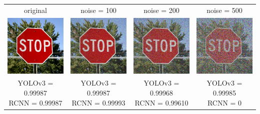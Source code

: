 \documentclass{article}
\begin{document}
\begin{center}
\begin{tabular}{ c c c c }
    original & noise = 100 & noise = 200 & noise = 500 \\
    \includegraphics[width=0.2\linewidth]{../test_images/stop.png} & \includegraphics[width=0.2\linewidth]{../test_images/perturbed/stop_noise_100.png} & \includegraphics[width=0.2\linewidth]{../test_images/perturbed/stop_noise_200.png} & \includegraphics[width=0.2\linewidth]{../test_images/perturbed/stop_noise_500.png} \\
    \makecell{YOLOv3 = 0.99987 \\ RCNN = 0.99987} & \makecell{YOLOv3 = 0.99987 \\ RCNN = 0.99993} & \makecell{YOLOv3 = 0.99968 \\ RCNN = 0.99610} & \makecell{YOLOv3 = 0.99985 \\ RCNN = 0} \\[1cm]

\end{tabular}
\end{center}
\end{document}
